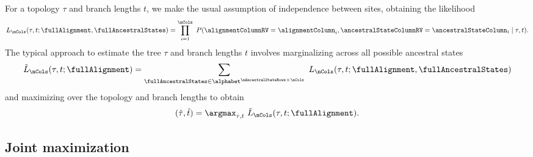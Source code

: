 For a topology $\tau$ and branch lengths $t$, we make the usual assumption of independence between sites, obtaining the likelihood
\begin{equation}
\label{eq:full_likelihood}
L_\nCols(\tau, t; \fullAlignment,\fullAncestralStates) = \prod_{i=1}^{\nCols} \ P(\alignmentColumnRV=\alignmentColumn_i, \ancestralStateColumnRV=\ancestralStateColumn_i \mid \tau, t).
\end{equation}
The typical approach to estimate the tree $\tau$ and branch lengths $t$ involves marginalizing across all possible ancestral states
\begin{equation}
\label{eq:marginal_likelihood}
\tilde{L}_\nCols(\tau, t; \fullAlignment) = \sum_{\fullAncestralStates\in\alphabet^{\nAncestralStateRows\times\nCols}} \ L_\nCols(\tau, t; \fullAlignment, \fullAncestralStates)
\end{equation}
and maximizing over the topology and branch lengths to obtain
$$
(\hat{\tau}, \hat{t}) = \argmax_{\tau, t} \  \tilde{L}_\nCols(\tau, t; \fullAlignment).
$$

\subsection{Joint maximization}

